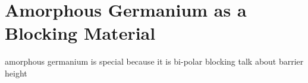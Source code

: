 \chapter{Amorphous Germanium as a Blocking Material}
amorphous germanium is special because it is bi-polar blocking
talk about barrier height

